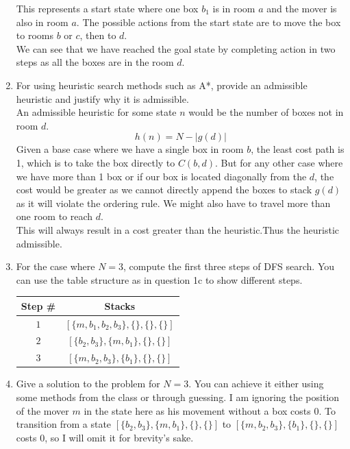 \begin{enumerate}
\begin{center}
        \end{center}
        This represents a start state where one box $b_1$ is in room $a$ and the mover is also in room $a$. The possible actions from the start state are to move the box to rooms $b$ or $c$, then to $d$.\\
        We can see that we have reached the goal state by completing action in two steps as all the boxes are in the room $d$.
  \item For using heuristic search methods such as A*, provide an admissible heuristic and justify why it is admissible.\\[10pt]
        An admissible heuristic for some state $n$ would be the number of boxes not in room $d$.
        $$
          h(n) = N - \lvert g(d)\rvert
        $$
        Given a base case where we have a single box in room $b$, the least cost path is 1, which is to take the box directly to $C(b,d)$. But for any other case where we have more than 1 box or if our box is located diagonally from the $d$, the cost would be greater as we cannot directly append the boxes to stack $g(d)$ as it will violate the ordering rule. We might also have to travel more than one room to reach $d$.\\
        This will always result in a cost greater than the heuristic.Thus the heuristic admissible.
  \item For the case where $N = 3$, compute the first three steps of DFS search. You can use the table structure as in question 1c to show different steps.
        \begin{center}
          \bgroup
          \def\arraystretch{1.5}%
          \begin{tabular}{|c|c|}
            \hline
            Step \# & Stacks                                    \\
            \hline
            $1$     & $[\{m,b_1, b_2, b_3\}, \{\}, \{\}, \{\}]$ \\
            $2$     & $[\{b_2, b_3\}, \{m,b_1\}, \{\}, \{\}]$   \\
            $3$     & $[\{m,b_2, b_3\}, \{b_1\}, \{\}, \{\}]$   \\
            \hline
          \end{tabular}
          \egroup
        \end{center}
  \item Give a solution to the problem for $N = 3$. You can achieve it either using some methods from the class or through guessing.
        I am ignoring the position of the mover $m$ in the state here as his movement without a box costs 0. To transition from a state $[\{b_2, b_3\}, \{m,b_1\}, \{\}, \{\}]$ to $[\{m,b_2, b_3\}, \{b_1\}, \{\}, \{\}]$ costs 0, so I will omit it for brevity's sake.

\end{enumerate}
